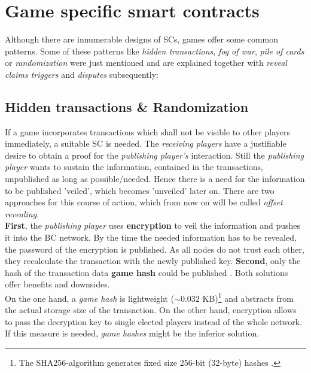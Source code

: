 \section{Game specific smart contracts}
\label{sec:GSSCs}

Although there are innumerable designs of \gls{SC}s, games offer some common patterns.
Some of these patterns like \textit{hidden transactions}, \textit{fog of war}, \textit{pile of cards} or \textit{randomization} were just mentioned and are explained together with \textit{reveal claims triggers} and \textit{disputes} subsequently:



\subsection{Hidden transactions \& Randomization}
\label{sec:HiddenTransactionsPlusRandomization}
If a game incorporates transactions which shall not be visible to other players immediately, a suitable \gls{SC} is needed. \label{lbl:HiddenTransactions}
The \textit{receiving players} have a justifiable desire to obtain a proof for the \textit{publishing player's} interaction.
Still the \textit{publishing player} wants to sustain the information, contained in the transactions, unpublished as long as possible/needed.
Hence there is a need for the information to be published 'veiled', which becomes 'unveiled' later on.
There are two approaches for this course of action, which from now on will be called \textit{offset revealing}. \\
\textbf{First}, the \textit{publishing player} uses \textbf{encryption} to veil the information and pushes it into the \gls{BC} network.
By the time the needed information has to be revealed, the password of the encryption is published.
As all nodes do not trust each other, they recalculate the transaction with the newly published key.
\textbf{Second}, only the hash of the transaction data \textbf{game hash} could be published \cite[94]{Kraft.2016}.
Both solutions offer benefits and downsides. \label{def:GameHash} \\
On the one hand, a \textit{game hash} is lightweight ($\sim0.032$ KB)\footnote{\hspace{0.1cm}The SHA256-algorithm generates fixed size 256-bit (32-byte) hashes \cite[7]{Rachmawati.2017}.}
and abstracts from the actual storage size of the transaction.
On the other hand, encryption allows to pass the decryption key to single elected players instead of the whole network.
If this measure is needed, \textit{game hashes} might be the inferior solution.

